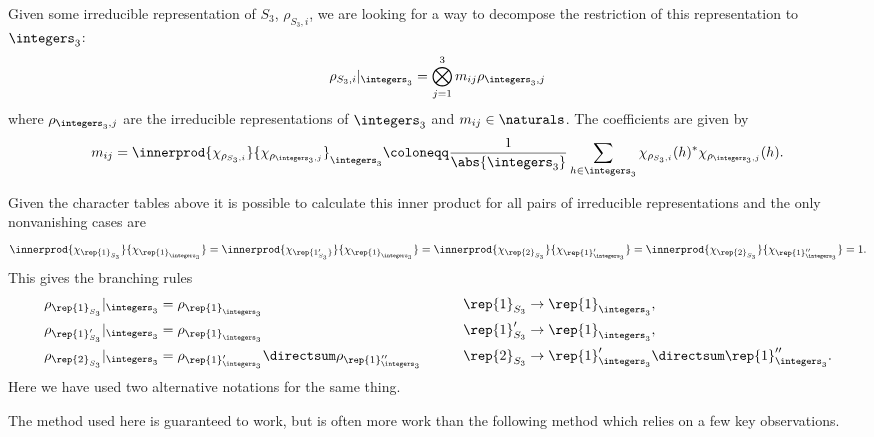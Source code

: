\begin{exm}{}{}
    Given some irreducible representation of \(S_3\), \(\rho_{S_3, i}\), we
    are looking for a way to decompose the restriction of this representation to
    \(\integers_3\):
    \begin{equation}
        \rho_{S_3, i}|_{\integers_3} = \bigotimes_{j = 1}^{3} m_{ij}
        \rho_{\integers_3, j}
    \end{equation}
    where \(\rho_{\integers_3, j}\) are the irreducible representations of
    \(\integers_3\) and \(m_{ij} \in \naturals\).
    The coefficients are given by
    \begin{equation}
        m_{ij} = \innerprod{\chi_{\rho_{S_3, i}}}{\chi_{\rho_{\integers_3,
                    j}}}_{\integers_3} \coloneqq \frac{1}{\abs{\integers_3}} \sum_{h \in
            \integers_3} \chi_{\rho_{S_3,i}}(h)^* \chi_{\rho_{\integers_3,j}}(h).
    \end{equation}
    
    Given the character tables above it is possible to calculate this inner
    product for all pairs of irreducible representations and the only nonvanishing
    cases are
    \begin{equation}
        \innerprod{\chi_{\rep{1}_{S_3}}}{\chi_{\rep{1}_{\integers_3}}} = 
        \innerprod{\chi_{\rep{1'_{S_3}}}}{\chi_{\rep{1}_{\integers_3}}} = 
        \innerprod{\chi_{\rep{2}_{S_3}}}{\chi_{\rep{1}'_{\integers_3}}} = 
        \innerprod{\chi_{\rep{2}_{S_3}}}{\chi_{\rep{1}''_{\integers_3}}} = 1.
    \end{equation}
    This gives the branching rules
    \begin{alignat}{4}
        \rho_{\rep{1}_{S_3}}|_{\integers_3} &= \rho_{\rep{1}_{\integers_3}}
        \qquad & \rep{1}_{S_3} &\to \rep{1}_{\integers_3},\\
        \rho_{\rep{1}'_{S_3}}|_{\integers_3} &= \rho_{\rep{1}_{\integers_3}}
        \qquad & \rep{1}'_{S_3} &\to \rep{1}_{\integers_3},\\
        \rho_{\rep{2}_{S_3}}|_{\integers_3} &= \rho_{\rep{1}'_{\integers_3}}
        \directsum \rho_{\rep{1}''_{\integers_3}} \qquad & \rep{2}_{S_3} &\to
        \rep{1}'_{\integers_3} \directsum \rep{1}''_{\integers_3}.
    \end{alignat}
    Here we have used two alternative notations for the same thing.
\end{exm}

The method used here is guaranteed to work, but is often more work than the
following method which relies on a few key observations.


